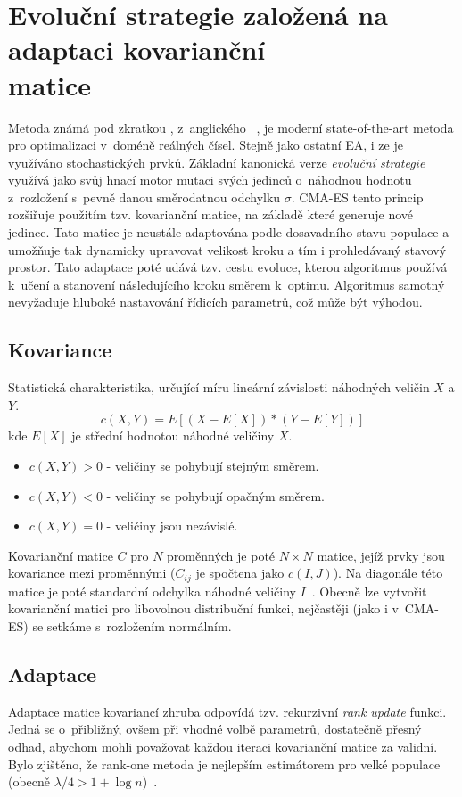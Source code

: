 \section{Evoluční strategie založená na adaptaci kovarianční \\\mbox{matice}}
\label{algs:cmaes}
Metoda známá pod zkratkou , z~anglického ~\cite{CMAES}, je moderní state-of-the-art metoda pro optimalizaci v~doméně reálných čísel. Stejně jako ostatní EA, i ze je využíváno stochastických prvků. Základní kanonická verze \textit{evoluční strategie} využívá jako svůj hnací motor mutaci svých jedinců o~náhodnou hodnotu z~rozložení s~pevně danou směrodatnou odchylku $\sigma$. CMA-ES tento princip rozšiřuje použitím tzv. kovarianční matice, na základě které generuje nové jedince. Tato matice je neustále adaptována podle dosavadního stavu populace a umožňuje tak dynamicky upravovat velikost kroku a tím i prohledávaný stavový prostor. Tato adaptace poté udává tzv. cestu evoluce, kterou algoritmus používá k~učení a stanovení následujícího kroku směrem k~optimu. Algoritmus samotný nevyžaduje hluboké nastavování řídicích parametrů, což může být výhodou.

\subsection{Kovariance}
\label{ss:kovar}
Statistická charakteristika, určující míru lineární závislosti náhodných veličin $X$ a $Y$.
$$c(X,Y) = E[(X-E[X])*(Y-E[Y])]$$
kde $E[X]$ je střední hodnotou náhodné veličiny $X$.
\begin{itemize}
    \item $c(X,Y) > 0$ - veličiny se pohybují stejným směrem.
    \item $c(X,Y) < 0$ - veličiny se pohybují opačným směrem.
    \item $c(X,Y) = 0$ - veličiny jsou nezávislé.
\end{itemize}
Kovarianční matice $C$ pro $N$ proměnných je poté $N \times N$ matice, jejíž prvky jsou kovariance mezi proměnnými ($C_{ij}$ je spočtena jako $c(I,J)$). Na diagonále této matice je poté standardní odchylka náhodné veličiny $I$~\cite{CMAES}. Obecně lze vytvořit kovarianční matici pro libovolnou distribuční funkci, nejčastěji (jako i v~CMA-ES) se setkáme s~rozložením normálním.

\subsection{Adaptace}
Adaptace matice kovariancí zhruba odpovídá tzv. rekurzivní \textit{rank update} funkci. Jedná se o~přibližný, ovšem při vhodné volbě parametrů, dostatečně přesný odhad, abychom mohli považovat každou iteraci kovarianční matice za validní. Bylo zjištěno, že rank-one metoda je nejlepším estimátorem pro velké populace (obecně $\lambda/4 > 1 + \log n$)~\cite{CMAES}.

